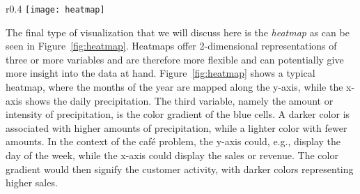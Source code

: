 \begin{wrapfigure}{r}{0.4\textwidth}
    \centering
    \texttt{[image: heatmap]}
    \caption{A heatmap~\cite{atlassianHeatmaps}.}\label{fig:heatmap}
\end{wrapfigure}
The final type of visualization that we will discuss here is the \textit{heatmap} as can be seen in
Figure~\ref{fig:heatmap}.
Heatmaps offer 2-dimensional representations of three or more variables and are therefore more flexible and can
potentially give more insight into the data at hand.
Figure~\ref{fig:heatmap} shows a typical heatmap, where the months of the year are mapped along the y-axis, while the
x-axis shows the daily precipitation.
The third variable, namely the amount or intensity of precipitation, is the color gradient of the blue cells.
A darker color is associated with higher amounts of precipitation, while a lighter color with fewer amounts.
In the context of the café problem, the y-axis could, e.g., display the day of the week, while the x-axis could display
the sales or revenue.
The color gradient would then signify the customer activity, with darker colors representing higher sales.

